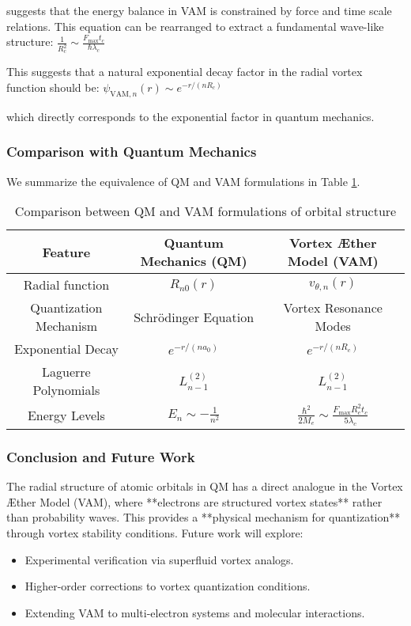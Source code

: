 suggests that the energy balance in VAM is constrained by force and time scale relations. This equation can be rearranged to extract a fundamental wave-like structure:
$\frac{1}{R_c^2} \sim \frac{F_{\text{max}} t_c}{\hbar \lambda_c}$

This suggests that a natural exponential decay factor in the radial vortex function should be:
$\psi_{\text{VAM},n}(r) \sim e^{-r / (n R_c)}$


which directly corresponds to the exponential factor in quantum mechanics.

\subsubsection{Comparison with Quantum Mechanics}
We summarize the equivalence of QM and VAM formulations in Table \ref{tab:qm_vam}.

\begin{table}[h]
    \centering
    \renewcommand{\arraystretch}{1.3}
    \begin{tabular}{|c|c|c|}
        \hline
        \textbf{Feature} & \textbf{Quantum Mechanics (QM)} & \textbf{Vortex Æther Model (VAM)} \\
        \hline
        Radial function & \( R_{n0}(r) \) & \( v_{\theta, n}(r) \) \\
        \hline
        Quantization Mechanism & Schrödinger Equation & Vortex Resonance Modes \\
        \hline
        Exponential Decay & \( e^{-r / (n a_0)} \) & \( e^{-r / (n R_c)} \) \\
        \hline
        Laguerre Polynomials & \( L_{n-1}^{(2)} \) & \( L_{n-1}^{(2)} \) \\
        \hline
        Energy Levels & \( E_n \sim -\frac{1}{n^2} \) & \( \frac{\hbar^2}{2M_e} \sim \frac{F_{\text{max}} R_c^2 t_c}{5 \lambda_c} \) \\
        \hline
    \end{tabular}
    \caption{Comparison between QM and VAM formulations of orbital structure}
    \label{tab:qm_vam}
\end{table}

\subsubsection{Conclusion and Future Work}
The radial structure of atomic orbitals in QM has a direct analogue in the Vortex Æther Model (VAM), where **electrons are structured vortex states** rather than probability waves. This provides a **physical mechanism for quantization** through vortex stability conditions. Future work will explore:
\begin{itemize}
    \item Experimental verification via superfluid vortex analogs.
    \item Higher-order corrections to vortex quantization conditions.
    \item Extending VAM to multi-electron systems and molecular interactions.
\end{itemize}


